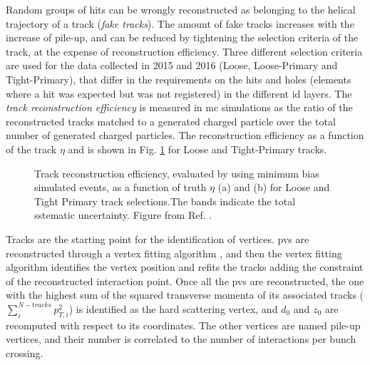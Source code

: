 Random groups of hits can be wrongly reconstructed as belonging to the helical trajectory of a track (\textit{fake tracks}). The amount of fake tracks increases with the increase of pile-up, and can be reduced by tightening the selection criteria of the track, at the expense of reconstruction efficiency. Three different selection criteria are used for the data collected in 2015 and 2016 (Loose, Loose-Primary and Tight-Primary), that differ in the requirements on the hits and holes (elements where a hit was expected but was not registered) in the different \gls{id} layers. The \textit{track reconstruction efficiency} is measured in \gls{mc} simulations as the ratio of the reconstructed tracks matched to a generated charged particle over the total number of generated charged particles. The reconstruction efficiency as a function of the track $\eta$ and \pt is shown in Fig. \ref{fig:obj:tracks} for Loose and Tight-Primary tracks.
 
\begin{figure}[ht]
\centering
{}
\caption{Track reconstruction efficiency, evaluated by using minimum bias simulated events, as a function of truth $\eta$ (a) and \pt (b) for Loose and Tight Primary track selections.The bands indicate the total sstematic uncertainty. Figure from Ref. \cite{ATL-PHYS-PUB-2015-051}.}
\label{fig:obj:tracks}
\end{figure}

Tracks are the starting point for the identification of vertices. \glspl{pv} are reconstructed through a vertex fitting algorithm \cite{Fruhwirth:2007hz}, and then the vertex fitting algorithm identifies the vertex position and refits the tracks adding the constraint of the reconstructed interaction point. Once all the \glspl{pv} are reconstructed, the one with the highest sum of the squared transverse momenta of its associated tracks ($\sum_i^{N-tracks}p_{T,i}^2$) is identified as the hard scattering vertex, and $d_0$ and $z_0$ are recomputed with respect to its coordinates. The other vertices are named pile-up vertices, and their number is correlated  to the number of interactions per bunch crossing.


